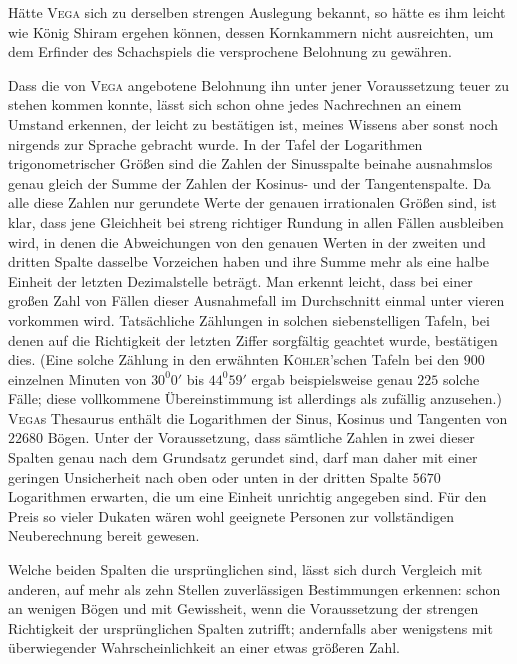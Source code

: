 Hätte \textsc{Vega} sich zu derselben strengen Auslegung bekannt, so hätte es ihm leicht wie König Shiram ergehen können, dessen Kornkammern nicht ausreichten, um dem Erfinder des Schachspiels die versprochene Belohnung zu gewähren.

Dass die von \textsc{Vega} angebotene Belohnung ihn unter jener Voraussetzung teuer zu stehen kommen konnte, lässt sich schon ohne jedes Nachrechnen an einem Umstand erkennen, der leicht zu bestätigen ist, meines Wissens aber sonst noch nirgends zur Sprache gebracht wurde. In der Tafel der Logarithmen trigonometrischer Größen sind die Zahlen der Sinusspalte beinahe ausnahmslos genau gleich der Summe der Zahlen der Kosinus- und der Tangentenspalte. Da alle diese Zahlen nur gerundete Werte der genauen irrationalen Größen sind, ist klar, dass jene Gleichheit bei streng richtiger Rundung in allen Fällen ausbleiben wird, in denen die Abweichungen von den genauen Werten in der zweiten und dritten Spalte dasselbe Vorzeichen haben und ihre Summe mehr als eine halbe Einheit der letzten Dezimalstelle beträgt. Man erkennt leicht, dass bei einer großen  Zahl von Fällen dieser Ausnahmefall im Durchschnitt einmal unter vieren vorkommen wird. Tatsächliche Zählungen in solchen siebenstelligen Tafeln, bei denen auf die Richtigkeit der letzten Ziffer sorgfältig geachtet wurde, bestätigen dies. (Eine solche Zählung in den erwähnten \textsc{Köhler}'schen Tafeln bei den \(900\) einzelnen Minuten von \(30^{0}0'\) bis \(44^{0}59'\) ergab beispielsweise genau \(225\) solche Fälle; diese vollkommene Übereinstimmung ist allerdings als zufällig anzusehen.) \textsc{Vega}s Thesaurus enthält die Logarithmen der Sinus, Kosinus und Tangenten von \(22680\) Bögen. Unter der Voraussetzung, dass sämtliche Zahlen in zwei dieser Spalten genau nach dem Grundsatz gerundet sind, darf man daher mit einer geringen Unsicherheit nach oben oder unten in der dritten Spalte \(5670\) Logarithmen erwarten, die um eine Einheit unrichtig angegeben sind. Für den Preis so vieler Dukaten wären wohl geeignete Personen zur vollständigen Neuberechnung bereit gewesen.

Welche beiden Spalten die ursprünglichen sind, lässt sich durch Vergleich mit anderen, auf mehr als zehn Stellen zuverlässigen Bestimmungen erkennen: schon an wenigen Bögen und mit Gewissheit, wenn die Voraussetzung der strengen Richtigkeit der ursprünglichen Spalten zutrifft; andernfalls aber wenigstens mit überwiegender Wahrscheinlichkeit an einer etwas größeren Zahl.

